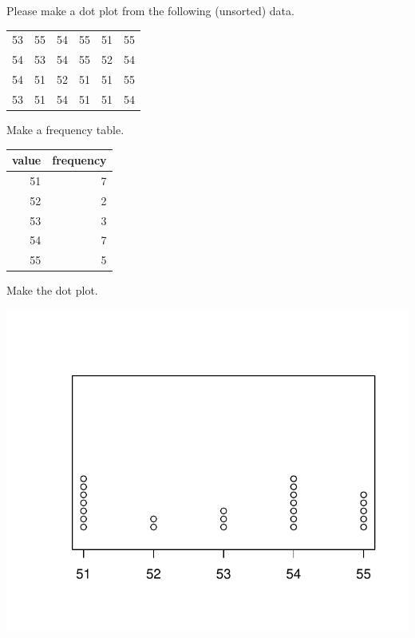 
\begin{question}
Please make a dot plot from the following (unsorted) data.

\begin{longtable}[]{@{}rrrrrr@{}}
\toprule
53 & 55 & 54 & 55 & 51 & 55\tabularnewline
54 & 53 & 54 & 55 & 52 & 54\tabularnewline
54 & 51 & 52 & 51 & 51 & 55\tabularnewline
53 & 51 & 54 & 51 & 51 & 54\tabularnewline
\bottomrule
\end{longtable}
\end{question}

\begin{solution}
Make a frequency table.

\begin{longtable}[]{@{}rr@{}}
\toprule
value & frequency\tabularnewline
\midrule
\endhead
51 & 7\tabularnewline
52 & 2\tabularnewline
53 & 3\tabularnewline
54 & 7\tabularnewline
55 & 5\tabularnewline
\bottomrule
\end{longtable}

Make the dot plot.

\includegraphics{hist-1.pdf}\\
\end{solution}

